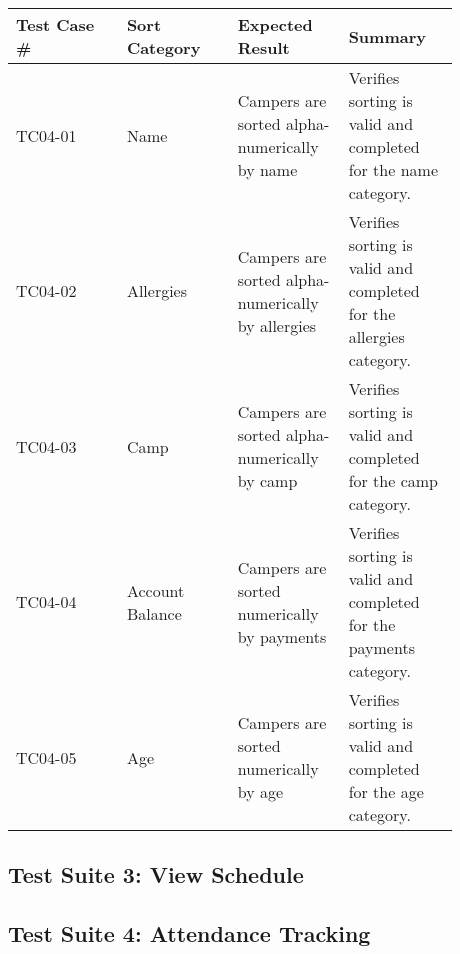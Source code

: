 \documentclass[11pt]{article}
\begin{document}
\begin{center}
\begin{longtable}{|p{0.22\linewidth}|p{0.22\linewidth}|p{0.22\linewidth}|p{0.22\linewidth}|}
	\hline
	Test Case \# & Sort Category & Expected Result & Summary\\\hline
	TC04-01 & Name & Campers are sorted alpha-numerically by name & Verifies sorting is valid and completed for the name category.\vspace*{1em}\\\hline
	TC04-02 & Allergies & Campers are sorted alpha-numerically by allergies & Verifies sorting is valid and completed for the allergies category.\vspace*{1em}\\	\hline
	TC04-03 & Camp & Campers are sorted alpha-numerically by camp & Verifies sorting is valid and completed for the camp category.\vspace*{1em}\\\hline
	TC04-04 & Account Balance & Campers are sorted numerically by payments & Verifies sorting is valid and completed for the payments category.\vspace*{1em}\\\hline
	TC04-05 & Age & Campers are sorted numerically by age & Verifies sorting is valid and completed for the age category.\vspace*{1em}\\\hline
\end{longtable}
\end{center}


\subsection*{Test Suite 3: View Schedule}



\subsection*{Test Suite 4: Attendance Tracking}
\end{document}
